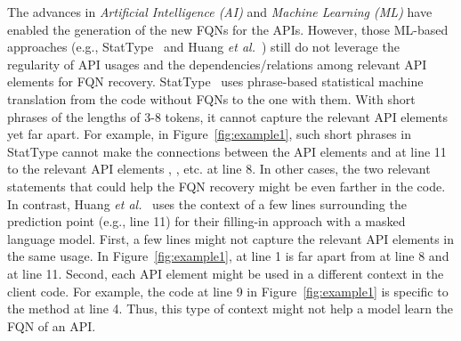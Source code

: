 The advances in {\em Artificial Intelligence (AI)} and {\em Machine
  Learning (ML)} have enabled the generation of the new FQNs for the
APIs. However, those ML-based approaches (e.g., StatType~\cite{icse18}
and Huang {\em et al.}~\cite{prompt-ase22}) still do not leverage the
regularity of API usages and the dependencies/relations among relevant
API elements for FQN recovery. StatType~\cite{icse18} uses
phrase-based statistical machine translation from the code without
FQNs to the one with them.  With short phrases of the lengths of 3-8
tokens, it cannot capture the relevant API elements yet far apart. For
example, in Figure~\ref{fig:example1}, such short phrases in StatType
cannot make the connections between the API elements 
and  at line 11 to the relevant API elements
, , etc. at line 8. In other cases,
the two relevant statements that could help the FQN recovery might be
even farther in the code. In contrast, Huang {\em et
  al.}~\cite{prompt-ase22} uses the context of a few lines surrounding
the prediction point (e.g., line 11) for their filling-in approach
with a masked language model. First, a few lines might not capture the
relevant API elements in the same usage. In Figure~\ref{fig:example1},
 at line 1 is far apart from  at line 8
and  at line 11. Second, each API element might be used
in a different context in the client code. For example, the code at
line 9 in Figure~\ref{fig:example1} is specific to the method
 at line 4. Thus, this type of context might not help a
model learn the FQN of an API.


